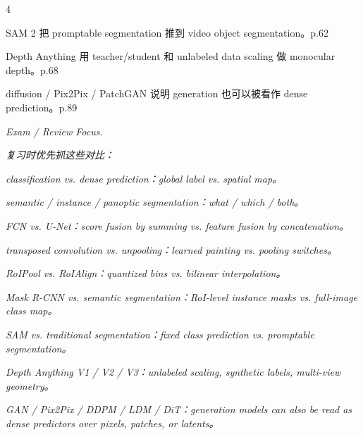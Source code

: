 \documentclass[8pt,a4paper,landscape]{extarticle}
\newcommand{\Body}[1]{{\tiny #1\par}}
\begin{document}
\begin{multicols*}{4}
\Body{\textbullet{} SAM 2 把 promptable segmentation 推到 video object segmentation。p.62}
\Body{\textbullet{} Depth Anything 用 teacher/student 和 unlabeled data scaling 做 monocular depth。p.68}
\Body{\textbullet{} diffusion / Pix2Pix / PatchGAN 说明 generation 也可以被看作 dense prediction。p.89}
\Body{\emph{Exam / Review Focus}.}
\Body{\emph{复习时优先抓这些对比：}}
\Body{\emph{}}
\Body{\textbullet{} \emph{classification vs. dense prediction：global label vs. spatial map。}}
\Body{\textbullet{} \emph{semantic / instance / panoptic segmentation：what / which / both。}}
\Body{\textbullet{} \emph{FCN vs. U-Net：score fusion by summing vs. feature fusion by concatenation。}}
\Body{\textbullet{} \emph{transposed convolution vs. unpooling：learned painting vs. pooling switches。}}
\Body{\textbullet{} \emph{RoIPool vs. RoIAlign：quantized bins vs. bilinear interpolation。}}
\Body{\textbullet{} \emph{Mask R-CNN vs. semantic segmentation：RoI-level instance masks vs. full-image class map。}}
\Body{\textbullet{} \emph{SAM vs. traditional segmentation：fixed class prediction vs. promptable segmentation。}}
\Body{\textbullet{} \emph{Depth Anything V1 / V2 / V3：unlabeled scaling, synthetic labels, multi-view geometry。}}
\Body{\textbullet{} \emph{GAN / Pix2Pix / DDPM / LDM / DiT：generation models can also be read as dense predictors over pixels, patches, or latents。}}


\end{multicols*}
\end{document}
